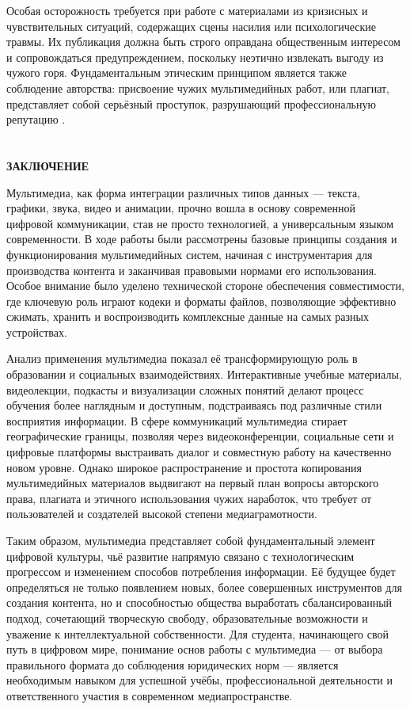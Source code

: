 \documentclass{SibFU-docs}
\begin{document}
Особая осторожность требуется при работе с материалами из кризисных и чувствительных ситуаций, содержащих сцены насилия или психологические травмы. Их публикация должна быть строго оправдана общественным интересом и сопровождаться предупреждением, поскольку неэтично извлекать выгоду из чужого горя. Фундаментальным этическим принципом является также соблюдение авторства: присвоение чужих мультимедийных работ, или плагиат, представляет собой серьёзный проступок, разрушающий профессиональную репутацию \cite{sizemtsev2021}.

\newpage
\section*{}
\vspace*{-2.5em}
\begin{center}\textbf{ЗАКЛЮЧЕНИЕ}\end{center}
{}

Мультимедиа, как форма интеграции различных типов данных — текста, графики, звука, видео и анимации, прочно вошла в основу современной цифровой коммуникации, став не просто технологией, а универсальным языком современности. В ходе работы были рассмотрены базовые принципы создания и функционирования мультимедийных систем, начиная с инструментария для производства контента и заканчивая правовыми нормами его использования. Особое внимание было уделено технической стороне обеспечения совместимости, где ключевую роль играют кодеки и форматы файлов, позволяющие эффективно сжимать, хранить и воспроизводить комплексные данные на самых разных устройствах.

Анализ применения мультимедиа показал её трансформирующую роль в образовании и социальных взаимодействиях. Интерактивные учебные материалы, видеолекции, подкасты и визуализации сложных понятий делают процесс обучения более наглядным и доступным, подстраиваясь под различные стили восприятия информации. В сфере коммуникаций мультимедиа стирает географические границы, позволяя через видеоконференции, социальные сети и цифровые платформы выстраивать диалог и совместную работу на качественно новом уровне. Однако широкое распространение и простота копирования мультимедийных материалов выдвигают на первый план вопросы авторского права, плагиата и этичного использования чужих наработок, что требует от пользователей и создателей высокой степени медиаграмотности.

Таким образом, мультимедиа представляет собой фундаментальный элемент цифровой культуры, чьё развитие напрямую связано с технологическим прогрессом и изменением способов потребления информации. Её будущее будет определяться не только появлением новых, более совершенных инструментов для создания контента, но и способностью общества выработать сбалансированный подход, сочетающий творческую свободу, образовательные возможности и уважение к интеллектуальной собственности. Для студента, начинающего свой путь в цифровом мире, понимание основ работы с мультимедиа — от выбора правильного формата до соблюдения юридических норм — является необходимым навыком для успешной учёбы, профессиональной деятельности и ответственного участия в современном медиапространстве.
\end{document}
